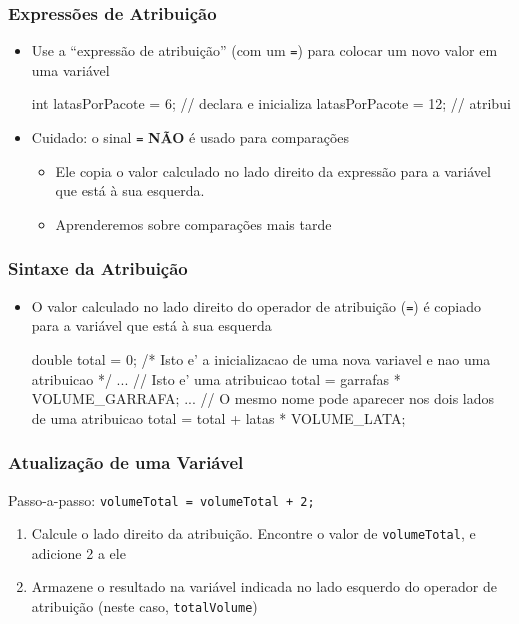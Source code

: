 \documentclass[xcolor={dvipsnames,table},aspectratio=169]{beamer}
\begin{document}
\begin{frame}[fragile]\frametitle{Expressões de Atribuição}
\begin{itemize}
	\item Use a ``expressão de atribuição'' (com um \texttt{=}) para colocar um novo valor em uma variável
\begin{javacode}
int latasPorPacote = 6;  // declara e inicializa
latasPorPacote = 12;     // atribui
\end{javacode}
	\item Cuidado: o sinal \texttt{=} \textbf{NÃO} é usado para comparações
	\begin{itemize}
		\item Ele copia o valor calculado no lado direito da expressão para a variável que está à sua esquerda.
		\item Aprenderemos sobre comparações mais tarde
	\end{itemize}
\end{itemize}
\end{frame}

\begin{frame}[fragile]\frametitle{Sintaxe da Atribuição}
\begin{itemize}
	\item O valor calculado no lado direito do operador de atribuição (\texttt{=}) é copiado para a variável que está à sua esquerda
\begin{javacode}
double total = 0;   /* Isto e' a inicializacao
                       de uma nova variavel e
                       nao uma atribuicao */
...
// Isto e' uma atribuicao
total = garrafas * VOLUME_GARRAFA;
...
// O mesmo nome pode aparecer nos dois lados de uma atribuicao
total = total + latas * VOLUME_LATA;
\end{javacode}
\end{itemize}
\end{frame}

\begin{frame}\frametitle{Atualização de uma Variável}
Passo-a-passo: \texttt{volumeTotal = volumeTotal + 2;}
\begin{enumerate}
	\item Calcule o lado direito da atribuição. Encontre o valor de \texttt{volumeTotal}, e adicione 2 a ele
	\item Armazene o resultado na variável indicada no lado esquerdo do operador de atribuição (neste caso, \texttt{totalVolume})
\end{enumerate}
\end{frame}
\end{document}
